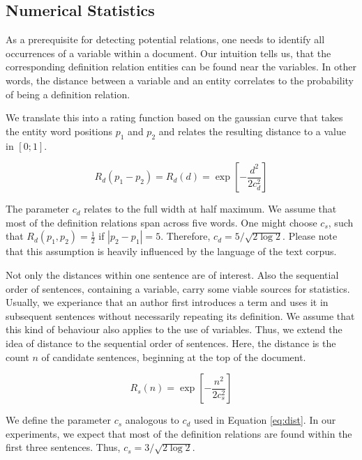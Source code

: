 \documentclass[runningheads]{llncs}
\begin{document}
\subsection{Numerical Statistics}
As a prerequisite for detecting potential relations, one needs to identify all occurrences of a variable within a document. Our intuition tells us, that the corresponding definition relation entities can be found near the variables. In other words, the distance between a variable and an entity correlates to the probability of being a definition relation.

We translate this into a rating function based on the gaussian curve that takes the entity word positions $p_{1}$ and $p_{2}$ and relates the resulting distance to a value in $[0;1]$.

\begin{equation}
\label{eq:dist}
R_{d}(p_{1}-p_{2}) = R_{d}(d) = \exp\left[-\frac{d^{2}}{2c_{d}^{2}}\right]
\end{equation}

The parameter $c_{d}$ relates to the full width at half maximum. We assume that most of the definition relations span across five words. One might choose $c_{s}$, such that $R_{d}(p_{1},p_{2}) = \frac{1}{2}$ if $\left|p_{2}-p_{1}\right| = 5$. Therefore, $c_{d} = 5 / \sqrt{2\log{2}}$. Please note that this assumption is heavily influenced by the language of the text corpus. 

Not only the distances within one sentence are of interest. Also the sequential order of sentences, containing a variable, carry some viable sources for statistics. Usually, we experiance that an author first introduces a term and uses it in subsequent sentences without necessarily repeating its definition. We assume that this kind of behaviour also applies to the use of variables. Thus, we extend the idea of distance to the sequential order of sentences. Here, the distance is the count $n$ of candidate sentences, beginning at the top of the document.

\begin{equation}
\label{eq:order}
R_{s}(n) = \exp\left[-\frac{n^{2}}{2c_{s}^{2}}\right]
\end{equation}

We define the parameter $c_{s}$ analogous to $c_{d}$ used in Equation \ref{eq:dist}. In our experiments, we expect that most of the definition relations are found within the first three sentences. Thus, $c_{s} = 3 / \sqrt{2\log{2}}$.
\end{document}

